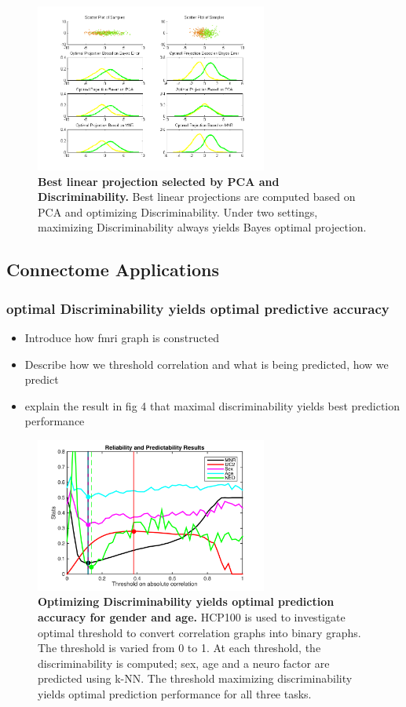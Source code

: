 \documentclass{article}
\begin{document}
\begin{figure}[t!]
\includegraphics[width=3.0in]{../Figs/parameter_selection_2sub.png}
\caption{{\bf Best linear projection selected by PCA and Discriminability.} Best linear projections are computed based on PCA and optimizing Discriminability. Under two settings, maximizing Discriminability always yields Bayes optimal projection. }
\label{fig:3}
\end{figure}




\subsection{Connectome Applications}

\subsubsection{optimal Discriminability yields optimal predictive accuracy}
\begin{itemize}
\item Introduce how fmri graph is constructed
\item Describe how we threshold correlation and what is being predicted, how we predict
\item explain the result in fig 4 that maximal discriminability yields best prediction performance 
\end{itemize}

\begin{figure}[t!]
\includegraphics[width=3.0in]{../Figs/HCP.png}
\caption{{\bf Optimizing Discriminability yields optimal prediction accuracy for gender and age.} HCP100 is used to investigate optimal threshold to convert correlation graphs into binary graphs. The threshold is varied from 0 to 1. At each threshold, the discriminability is computed; sex, age and a neuro factor are predicted using k-NN. The threshold maximizing discriminability yields optimal prediction performance for all three tasks. }
\label{fig:4}
\end{figure}
\end{document}
